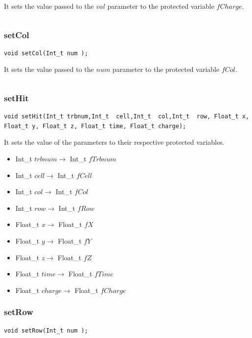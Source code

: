 \documentclass[a4paper]{book}
\begin{document}
It sets the value passed to the $val$ parameter to the protected variable $fCharge$.

\[\]

\subsubsection{setCol}

\begin{lstlisting}[style=customc]
void setCol(Int_t num );
\end{lstlisting}

It sets the value passed to the $num$ parameter to the protected variable $fCol$.

\[\]

\subsubsection{setHit}

\begin{lstlisting}[style=customc]
void setHit(Int_t trbnum,Int_t  cell,Int_t  col,Int_t  row, Float_t x, Float_t y, Float_t z, Float_t time, Float_t charge);
\end{lstlisting}

It sets the value of the parameters to their respective protected variables.

\begin{itemize}
	\item Int\_t $trbnum \rightarrow$ Int\_t $fTrbnum$
	\item Int\_t $cell \rightarrow$ Int\_t $fCell$
	\item Int\_t $col \rightarrow$ Int\_t $fCol$
	\item Int\_t $row \rightarrow$ Int\_t $fRow$
	\item Float\_t $x \rightarrow$ Float\_t $fX$
	\item Float\_t $y \rightarrow$ Float\_t $fY$
	\item Float\_t $z \rightarrow$ Float\_t $fZ$
	\item Float\_t $time \rightarrow$ Float\_t $fTime$
	\item Float\_t $charge \rightarrow$ Float\_t $fCharge$
\end{itemize}

\subsubsection{setRow}

\begin{lstlisting}[style=customc]
void setRow(Int_t num );
\end{lstlisting}
\end{document}
